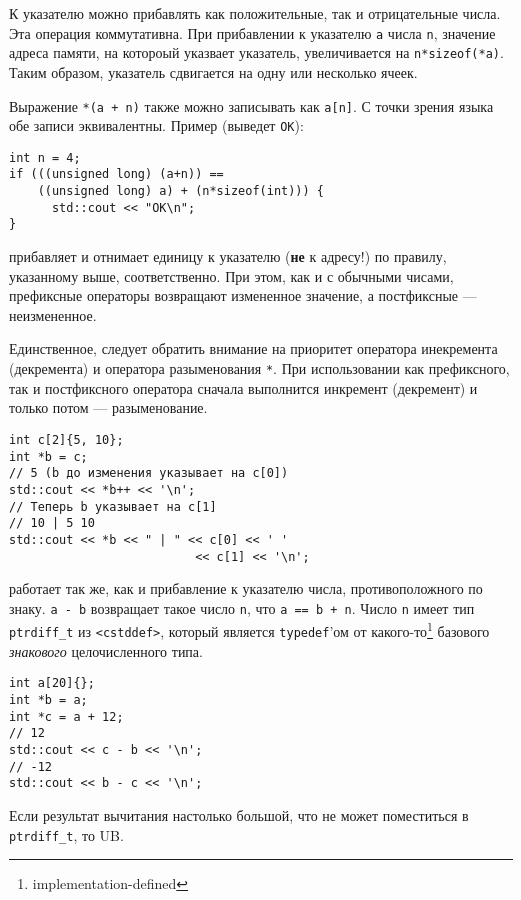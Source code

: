 \begin{enumerate}
   К указателю можно прибавлять как положительные,
  так и отрицательные числа. Эта операция коммутативна. При прибавлении к указателю
  \verb|a| числа \verb|n|, значение адреса памяти, на котороый указвает указатель,
  увеличивается на \verb|n*sizeof(*a)|. Таким образом, указатель сдвигается на одну или
  несколько ячеек.

  Выражение \verb|*(a + n)| также можно записывать как \verb|a[n]|.
  С точки зрения языка обе записи эквивалентны.
  Пример (выведет \verb|OK|):
\begin{verbatim}
int n = 4;
if (((unsigned long) (a+n)) ==
    ((unsigned long) a) + (n*sizeof(int))) {
      std::cout << "OK\n";
}
\end{verbatim}

   прибавляет и отнимает единицу к указателю (\textbf{не} к адресу!) по правилу, указанному
  выше, соответственно. При этом, как и с обычными чисами, префиксные операторы возвращают измененное
  значение, а постфиксные --- неизмененное.

  Единственное, следует обратить внимание на приоритет оператора инекремента (декремента)
  и оператора разыменования \verb|*|. При использовании как префиксного, так и постфиксного
  оператора сначала выполнится инкремент (декремент) и только потом --- разыменование.
\begin{verbatim}
int c[2]{5, 10};
int *b = c;
// 5 (b до изменения указывает на c[0])
std::cout << *b++ << '\n';
// Теперь b указывает на c[1]
// 10 | 5 10
std::cout << *b << " | " << c[0] << ' '
                          << c[1] << '\n';
\end{verbatim}

   работает так же, как и прибавление к указателю
  числа, противоположного по знаку.
   \verb|a - b| возвращает такое число \verb|n|,
  что \verb|a == b + n|. Число \verb|n| имеет тип \verb|ptrdiff_t| из \verb|<cstddef>|,
  который является \verb|typedef|'ом от какого-то\footnote{implementation-defined} базового
  \textit{знакового} целочисленного типа.
\begin{verbatim}
int a[20]{};
int *b = a;
int *c = a + 12;
// 12
std::cout << c - b << '\n';
// -12
std::cout << b - c << '\n';
\end{verbatim}
  Если результат вычитания настолько большой, что не может поместиться в \verb|ptrdiff_t|,
  то UB.
\end{enumerate}

